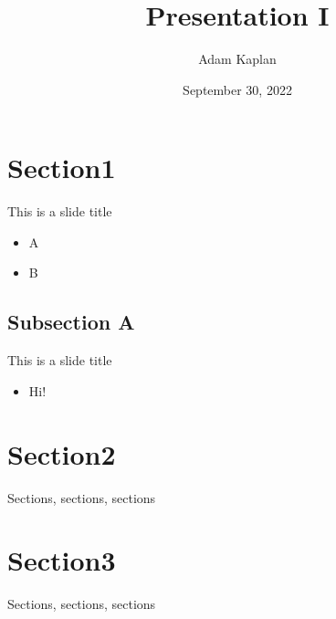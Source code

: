 \documentclass{beamer}
\author[Kaplan]{Adam Kaplan}
\title{Presentation I}
\date[Sept 30, 2022]{September 30, 2022}
\begin{document}
\begin{frame}
	\maketitle
\end{frame}

\begin{frame}
	\tableofcontents
\end{frame}

\section{Section1}
\begin{frame}{This is a slide title}
	\begin{itemize}
		\item{A}
		\pause
		\item{B}
	\end{itemize}
\end{frame}

\subsection{Subsection A}
\begin{frame}{This is a slide title}
	\begin{itemize}
		\item{Hi!}
	\end{itemize}
\end{frame}

\section{Section2}
\begin{frame}
	\textnormal{Sections, sections, sections}
\end{frame}

\section{Section3}
\begin{frame}
	\textnormal{Sections, sections, sections}
\end{frame}
\end{document}
